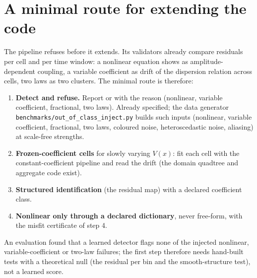 \section{A minimal route for extending the code}\label{sec:route}
The pipeline refuses before it extends. Its validators already compare residuals per cell and per time window: a nonlinear equation shows as amplitude-dependent coupling, a variable coefficient as drift of the dispersion relation across cells, two laws as two clusters. The minimal route is therefore:
\begin{enumerate}
\item \textbf{Detect and refuse.} Report \MIS{} or \UND{} with the reason (nonlinear, variable coefficient, fractional, two laws). Already specified; the data generator \texttt{benchmarks/out\_of\_class\_inject.py} builds such inputs (nonlinear, variable coefficient, fractional, two laws, coloured noise, heteroscedastic noise, aliasing) at scale-free strengths.
\item \textbf{Frozen-coefficient cells} for slowly varying $V(x)$: fit each cell with the constant-coefficient pipeline and read the drift (the domain quadtree and aggregate code exist).
\item \textbf{Structured identification} (the residual map) with a declared coefficient class.
\item \textbf{Nonlinear only through a declared dictionary}, never free-form, with the misfit certificate of step 4.
\end{enumerate}
An evaluation found that a learned detector flags none of the injected nonlinear, variable-coefficient or two-law failures; the first step therefore needs hand-built tests with a theoretical null (the residual per bin and the smooth-structure test), not a learned score.



